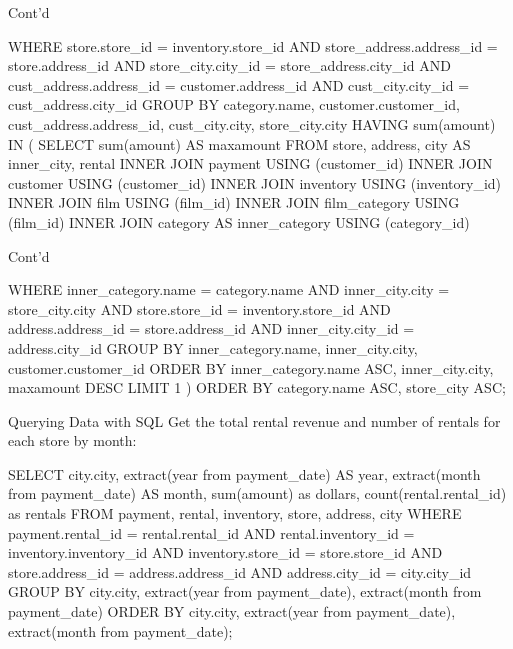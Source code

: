 \documentclass[ignorenonframetext,xcolor=x11names]{beamer}
\begin{document}
\begin{frame}[label=withcode,fragile]{Cont'd}
\scriptsize
\begin{sqlcode}
 WHERE store.store_id = inventory.store_id
   AND store_address.address_id = store.address_id
   AND store_city.city_id = store_address.city_id
   AND cust_address.address_id = customer.address_id
   AND cust_city.city_id = cust_address.city_id
 GROUP BY category.name, customer.customer_id, 
         cust_address.address_id, cust_city.city, 
         store_city.city
 HAVING sum(amount) IN (
  SELECT sum(amount) AS maxamount
   FROM store, address, city AS inner_city, rental
   INNER JOIN payment USING (customer_id)
   INNER JOIN customer USING (customer_id)
   INNER JOIN inventory USING (inventory_id)
   INNER JOIN film USING (film_id)
   INNER JOIN film_category USING (film_id)
   INNER JOIN category AS inner_category USING (category_id)
\end{sqlcode}
\end{frame}

\begin{frame}[label=withcode,fragile]{Cont'd}
\scriptsize
\begin{sqlcode}
   WHERE inner_category.name = category.name AND
         inner_city.city = store_city.city AND
         store.store_id = inventory.store_id AND
         address.address_id = store.address_id AND
         inner_city.city_id = address.city_id
   GROUP BY inner_category.name, 
            inner_city.city, 
            customer.customer_id
   ORDER BY inner_category.name ASC, 
            inner_city.city, 
            maxamount DESC
   LIMIT 1 )
 ORDER BY category.name ASC, store_city ASC;
\end{sqlcode}
\end{frame}

\begin{frame}[label=withcode,fragile]{Querying Data with SQL}
Get the total rental revenue and number of rentals for each store by month:
\scriptsize
\begin{sqlcode}
SELECT city.city, 
       extract(year from payment_date) AS year, 
       extract(month from payment_date) AS month, 
       sum(amount) as dollars, 
       count(rental.rental_id) as rentals
FROM payment, rental, inventory, store, address, city
WHERE payment.rental_id = rental.rental_id AND
      rental.inventory_id = inventory.inventory_id AND
      inventory.store_id = store.store_id AND
      store.address_id = address.address_id AND
      address.city_id = city.city_id
GROUP BY city.city, 
         extract(year from payment_date), 
         extract(month from payment_date)
ORDER BY city.city, 
         extract(year from payment_date), 
         extract(month from payment_date);
\end{sqlcode}
\end{frame}
\end{document}
